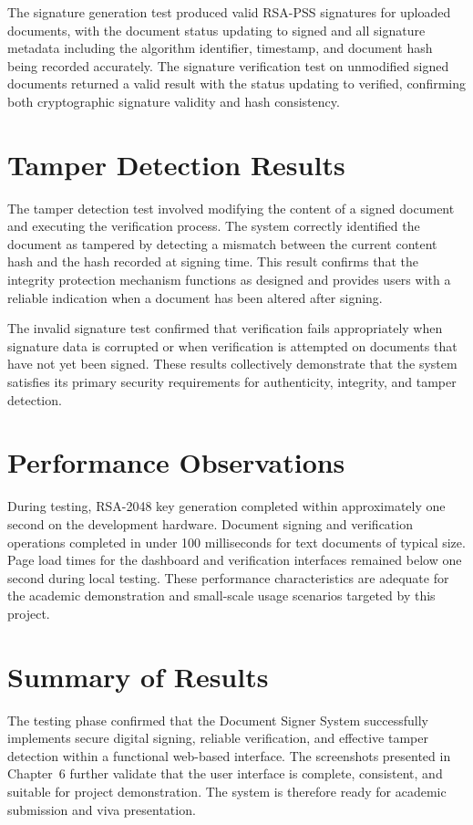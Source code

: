 The signature generation test produced valid RSA-PSS signatures for uploaded documents, with the document status updating to signed and all signature metadata including the algorithm identifier, timestamp, and document hash being recorded accurately. The signature verification test on unmodified signed documents returned a valid result with the status updating to verified, confirming both cryptographic signature validity and hash consistency.

\section{Tamper Detection Results}

The tamper detection test involved modifying the content of a signed document and executing the verification process. The system correctly identified the document as tampered by detecting a mismatch between the current content hash and the hash recorded at signing time. This result confirms that the integrity protection mechanism functions as designed and provides users with a reliable indication when a document has been altered after signing.

The invalid signature test confirmed that verification fails appropriately when signature data is corrupted or when verification is attempted on documents that have not yet been signed. These results collectively demonstrate that the system satisfies its primary security requirements for authenticity, integrity, and tamper detection.

\section{Performance Observations}

During testing, RSA-2048 key generation completed within approximately one second on the development hardware. Document signing and verification operations completed in under 100 milliseconds for text documents of typical size. Page load times for the dashboard and verification interfaces remained below one second during local testing. These performance characteristics are adequate for the academic demonstration and small-scale usage scenarios targeted by this project.

\section{Summary of Results}

The testing phase confirmed that the Document Signer System successfully implements secure digital signing, reliable verification, and effective tamper detection within a functional web-based interface. The screenshots presented in Chapter~6 further validate that the user interface is complete, consistent, and suitable for project demonstration. The system is therefore ready for academic submission and viva presentation.
